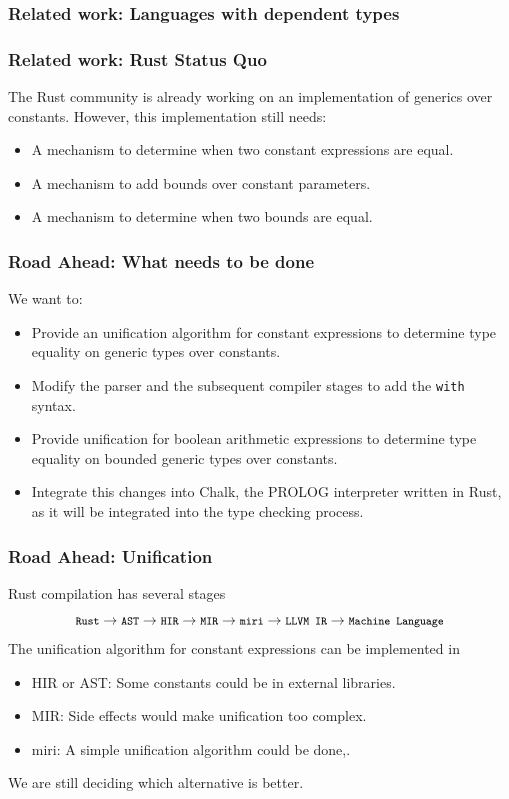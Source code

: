 \documentclass{beamer}
\newcommand{\code}[1] {\texttt{\footnotesize #1}}
\begin{document}
\begin{frame}[fragile]
    \frametitle{Related work: Languages with dependent types}
\end{frame}

\begin{frame}[fragile]
    \frametitle{Related work: Rust Status Quo}
    The Rust community is already working on an implementation of generics over constants. However, this implementation still needs:
    \begin{itemize}
        \item A mechanism to determine when two constant expressions are equal.
        \item A mechanism to add bounds over constant parameters.
        \item A mechanism to determine when two bounds are equal.
    \end{itemize}
\end{frame}

\begin{frame}[fragile]
    \frametitle{Road Ahead: What needs to be done}
    We want to:
    \begin{itemize}
        \item Provide an unification algorithm for constant expressions to determine type equality on generic types over constants.
        \item Modify the parser and the subsequent compiler stages to add the \code{with} syntax.
        \item Provide unification for boolean arithmetic expressions to determine type equality on bounded generic types over constants.
        \item Integrate this changes into Chalk, the PROLOG interpreter written in Rust, as it will be integrated into the type checking process.
    \end{itemize}
\end{frame}

\begin{frame}[fragile]
    \frametitle{Road Ahead: Unification}
    Rust compilation has several stages
    $$\code{Rust} \rightarrow \code{AST} \rightarrow \code{HIR} \rightarrow \code{MIR} \rightarrow \code{miri} \rightarrow \code{LLVM IR} \rightarrow \code{Machine Language}$$
    The unification algorithm for constant expressions can be implemented in
    \begin{itemize}
        \item HIR or AST: Some constants could be in external libraries.
        \item MIR: Side effects would make unification too complex. 
        \item miri: A simple unification algorithm could be done,.
    \end{itemize}
    We are still deciding which alternative is better.
\end{frame}
\end{document}
